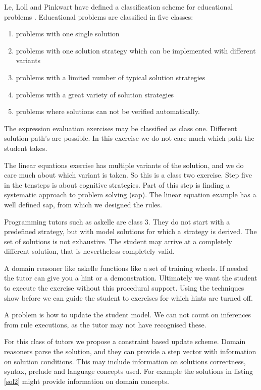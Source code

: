 Le, Loll and Pinkwart have defined a classification scheme for  educational problems \cite{exerciseClasses}.
Educational problems are classified in five classes:
\begin{enumerate}
\item problems with one single solution
\item problems with one solution strategy which can be implemented with different variants
\item problems with a  limited number of typical solution strategies
\item problems with a great variety of solution strategies
\item problems where solutions can not be verified automatically.
\end{enumerate}

The expression evaluation exercises may be classified as class one. 
Different solution path's are possible.
In this exercise we do not care much which path the student takes.

The linear equations exercise has multiple variants of the solution, and we do care much about which variant is taken.
So this is a class two exercise.
Step five in the \gls{tensteps} is about cognitive strategies.
Part of this step is finding a systematic approach to problem solving (\gls{sap}).
The linear equation example has a well defined \gls{sap}, from which we designed the rules.

Programming tutors such as \gls{askelle} are class 3.
They do not start with a predefined strategy, but with model solutions for which a strategy is derived.
The set of solutions is not exhaustive. 
The student may arrive at a completely different solution, that is nevertheless completely valid.

A domain reasoner like \gls{askelle} functions like a set of training wheels.
If needed the tutor can give you a hint or a demonstration.
Ultimately we want the student to execute the exercise without this procedural support.
Using the techniques show before we can guide the student to exercises for which hints are turned off.

A problem is how to update the student model.
We can not count on inferences from  rule executions, as the tutor may not have recognised these.

For this class of tutors we propose a constraint based update scheme.
Domain reasoners parse the solution, and they can provide a step vector with information on solution conditions.
This may include information on solutions correctness, syntax, prelude and language concepts used.
For example the solutions in listing  \ref{sol2} might provide information on domain concepts.

